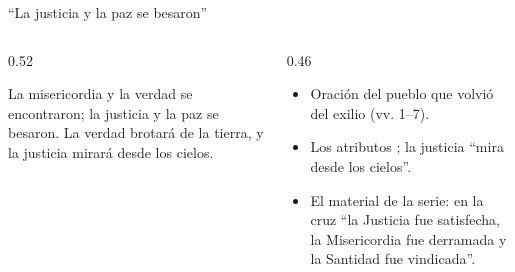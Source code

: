 \begin{frame}{``La justicia y la paz se besaron''}
\begin{columns}[c,onlytextwidth]
\begin{column}{0.52\textwidth}
\begin{cita}La misericordia y la verdad se encontraron; la justicia y la paz se besaron. La verdad brotará de la tierra, y la justicia mirará desde los cielos.\end{cita}
\begin{center}\small{}\end{center}
\end{column}
\begin{column}{0.46\textwidth}\small
\begin{itemize}
\item Oración del pueblo que volvió del exilio (vv. 1--7).
\item Los atributos ; la justicia ``mira desde los cielos''.
\item El material de la serie: en la cruz ``la Justicia fue satisfecha, la Misericordia fue derramada y la Santidad fue vindicada''.
\end{itemize}
\end{column}
\end{columns}\par\smallskip
{}
\end{frame}

